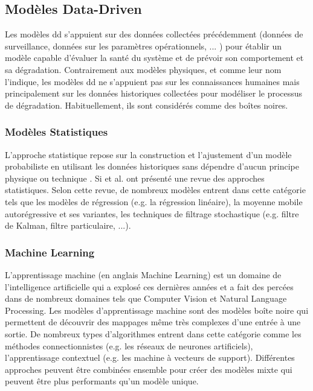 \subsection{Modèles Data-Driven}
Les modèles \acrlong{dd} s'appuient sur des données collectées précédemment (données de surveillance, données sur les paramètres opérationnels, ... ) pour établir un modèle capable d'évaluer la santé du système et de prévoir son comportement et sa dégradation. Contrairement aux modèles physiques, et comme leur nom l'indique, les modèles \acrlong{dd} ne s'appuient pas sur les connaissances humaines mais principalement sur les données historiques collectées pour modéliser le processus de dégradation. Habituellement, ils sont considérés comme des boîtes noires.

\subsubsection{Modèles Statistiques}
L'approche statistique repose sur la construction et l'ajustement d'un modèle probabiliste en utilisant les données historiques sans dépendre d'aucun principe physique ou technique \cite{Si2011}. 
Si et al. \cite{Si2011} ont présenté une revue des approches statistiques. Selon cette revue, de nombreux modèles entrent dans cette catégorie tels que les modèles de régression (e.g. la régression linéaire), la moyenne mobile autorégressive et ses variantes, les techniques de filtrage stochastique (e.g. filtre de Kalman, filtre particulaire, ...).

\subsubsection{Machine Learning}
L'apprentissage machine (en anglais Machine Learning) est un domaine de l'intelligence artificielle qui a explosé ces dernières années et a fait des percées dans de nombreux domaines tels que Computer Vision et Natural Language Processing. Les modèles d'apprentissage machine sont des modèles boîte noire qui permettent de découvrir des mappages même très complexes d'une entrée à une sortie. De nombreux types d'algorithmes entrent dans cette catégorie comme les méthodes connectionnistes (e.g. les réseaux de neurones artificiels), l'apprentissage contextuel (e.g. les machine à vecteurs de support). Différentes approches peuvent être combinées ensemble pour créer des modèles mixte qui peuvent être plus performants qu'un modèle unique.



